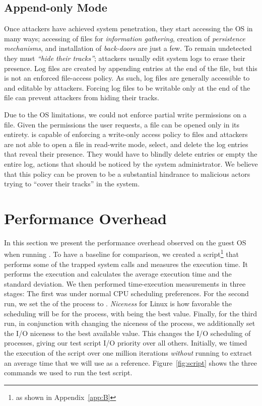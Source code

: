 \subsection{Append-only Mode}

\par Once attackers have achieved system penetration, they start accessing the \ac{OS} in many ways; accessing of files for \emph{information gathering}, creation of \emph{persistence mechanisms}, and installation of \emph{back-doors} are just a few. To remain undetected they must \emph{``hide their tracks''}; attackers usually edit system logs to erase their presence. Log files are created by appending entries at the end of the file, but this is not an enforced file-access policy. As such, log files are generally accessible to and editable by attackers. Forcing log files to be writable only at the end of the file can prevent attackers from hiding their tracks.

\par Due to the \ac{OS} limitations, we could not enforce partial write permissions on a file. Given the permissions the user requests, a file can be opened only in its entirety.  is capable of enforcing a write-only access policy to files and attackers are not able to open a file in read-write mode, select, and delete the log entries that reveal their presence. They would have to blindly delete entries or empty the entire log, actions that should be noticed by the system administrator. We believe that this policy can be proven to be a substantial hindrance to malicious actors trying to ``cover their tracks'' in the system.

\section{Performance Overhead}\label{sec:performance}

In this section we present the performance overhead observed on the guest \ac{OS} when running . To have a baseline for comparison, we created a  script\footnote{as shown in Appendix~\ref{app:B}} that performs some of the trapped system calls and measures the execution time. It performs the execution and calculates the average execution time and the standard deviation. We then performed time-execution measurements in three stages: The first was under normal \ac{CPU} scheduling preferences. For the second run, we set the  of the process to . \emph{Niceness} for Linux is how favorable the scheduling will be for the process, with  being the best value. Finally, for the third run, in conjunction with changing the niceness of the process, we additionally set the \ac{I/O} niceness to the best available value. This changes the \ac{I/O} scheduling of processes, giving our test script \ac{I/O} priority over all others. Initially, we timed the execution of the script over one million iterations \emph{without} running  to extract an average time that we will use as a reference. Figure~\ref{fig:script} shows the three commands we used to run the test script.

